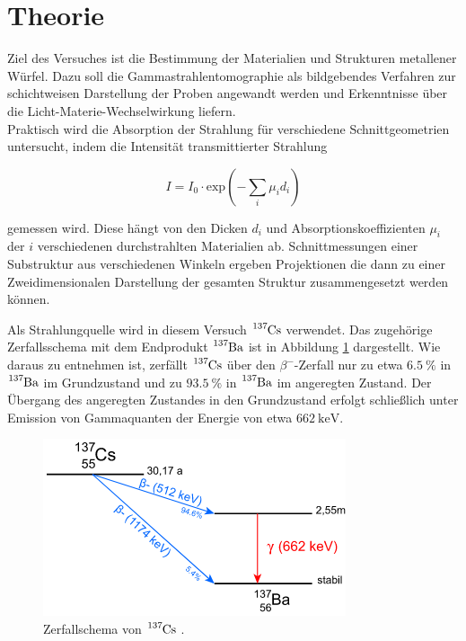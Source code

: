 \section{Theorie}
\label{sec:Theorie}

Ziel des Versuches ist die Bestimmung der Materialien und Strukturen
metallener Würfel. Dazu soll die Gammastrahlentomographie als
bildgebendes Verfahren zur schichtweisen Darstellung der Proben
angewandt werden und Erkenntnisse über die Licht-Materie-Wechselwirkung liefern.\\

Praktisch wird die Absorption der Strahlung für verschiedene
Schnittgeometrien untersucht, indem die Intensität transmittierter
Strahlung

\vspace{-5pt}
\begin{equation}
    I = I_0 \cdot \text{exp}\left(- \sum_i \mu_i d_i \right)
    \label{eqn:int}
\end{equation}

gemessen wird. Diese hängt von den Dicken $d_i$ und Absorptionskoeffizienten $\mu_i$
der $i$ verschiedenen durchstrahlten Materialien ab.
Schnittmessungen einer Substruktur aus verschiedenen Winkeln ergeben Projektionen
die dann zu einer Zweidimensionalen Darstellung der gesamten Struktur zusammengesetzt
werden können.

Als Strahlungquelle wird in diesem Versuch $\ce{^{137}Cs}$ verwendet. Das zugehörige 
Zerfallsschema mit dem Endprodukt $\ce{^{137}Ba}$ ist in Abbildung \ref{fig:schema}
dargestellt. Wie daraus zu entnehmen ist, zerfällt $\ce{^{137}Cs}$ über den $\beta^{-}$-Zerfall nur zu etwa $\SI{6.5}{\percent}$
in $\ce{^{137}Ba}$ im Grundzustand und zu $\SI{93.5}{\percent}$ in $\ce{^{137}Ba}$ im angeregten Zustand.
Der Übergang des angeregten Zustandes in den Grundzustand erfolgt schließlich unter Emission von
Gammaquanten der Energie von etwa $\SI{662}{\kilo\eV}$.

\vspace{-15pt}
\begin{figure}
    \centering
    \includegraphics[scale=0.6]{content/schema.png}
    \caption{Zerfallschema von $\ce{^{137}Cs}$ \cite{leifi}.}
    \label{fig:schema}
\end{figure}
\vspace{-5pt}

